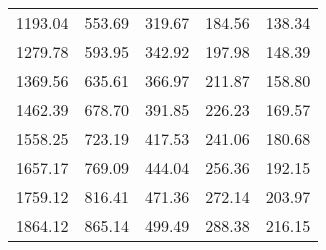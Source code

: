 \begin{tabular}{rrrrr}
1193.04 & 553.69 & 319.67 & 184.56 &  138.34 \\
1279.78 & 593.95 & 342.92 & 197.98 &  148.39 \\
1369.56 & 635.61 & 366.97 & 211.87 &  158.80 \\
1462.39 & 678.70 & 391.85 & 226.23 &  169.57 \\
1558.25 & 723.19 & 417.53 & 241.06 &  180.68 \\
1657.17 & 769.09 & 444.04 & 256.36 &  192.15 \\
1759.12 & 816.41 & 471.36 & 272.14 &  203.97 \\
1864.12 & 865.14 & 499.49 & 288.38 &  216.15 \\
\bottomrule
\end{tabular}
